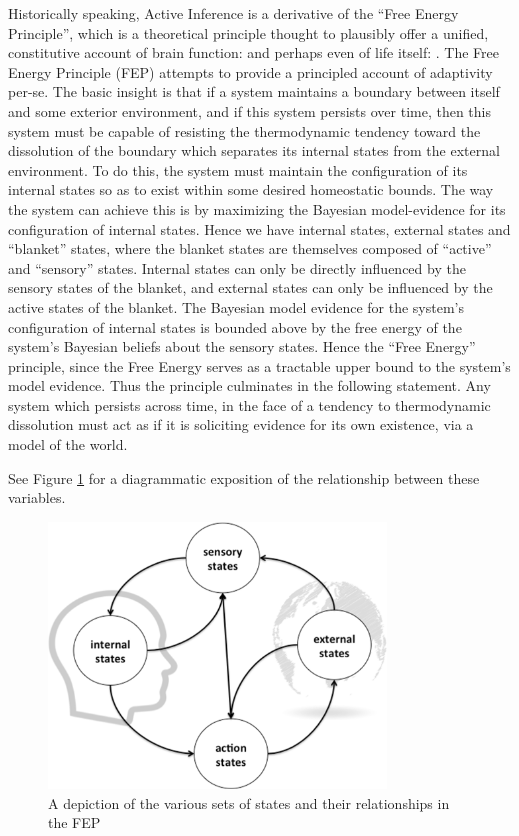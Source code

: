 \documentclass[onecolumn]{IEEEtran}
\begin{document}
Historically speaking, Active Inference is a derivative of the ``Free Energy Principle'', which is a theoretical principle thought to plausibly offer a unified, constitutive account of brain function: \textcite{FEP-Rough-Guide-Brain} and perhaps even of life itself: \textcite{Life-As-We-Know-It}. The Free Energy Principle (FEP) attempts to provide a principled account of adaptivity per-se. The basic insight is that if a system maintains a boundary between itself and some exterior environment, and if this system persists over time, then this system must be capable of resisting the thermodynamic tendency toward the dissolution of the boundary which separates its internal states from the external environment. To do this, the system must maintain the configuration of its internal states so as to exist within some desired homeostatic bounds. The way the system can achieve this is by maximizing the Bayesian model-evidence for its configuration of internal states. Hence we have internal states, external states and ``blanket'' states, where the blanket states are themselves composed of ``active'' and ``sensory'' states. Internal states can only be directly influenced by the sensory states of the blanket, and external states can only be influenced by the active states of the blanket. The Bayesian model evidence for the system's configuration of internal states is bounded above by the free energy of the system's Bayesian beliefs about the sensory states. Hence the ``Free Energy'' principle, since the Free Energy serves as a tractable upper bound to the system's model evidence. Thus the principle culminates in the following statement. Any system which persists across time, in the face of a tendency to thermodynamic dissolution must act as if it is soliciting evidence for its own existence, via a model of the world.  

See Figure \ref{fig:FEP} for a diagrammatic exposition of the relationship between these variables.

\begin{figure}[h]
  \centering
  \includegraphics[width=0.8\textwidth]{FEP}
  \caption{A depiction of the various sets of states and their relationships in the FEP}
  \label{fig:FEP}
\end{figure}
\end{document}
